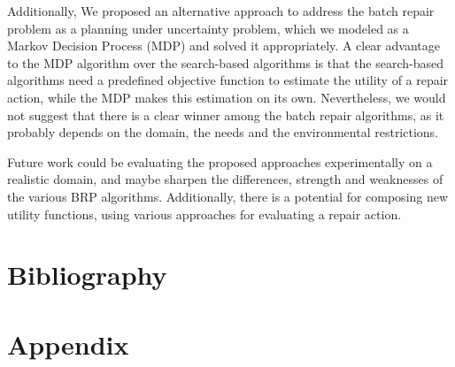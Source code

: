 \documentclass[review]{elsarticle}
\begin{document}
Additionally, We proposed an alternative approach to address the batch repair problem as a planning under uncertainty problem, which we modeled as a Markov Decision Process (MDP) and solved it appropriately. A clear advantage to the MDP algorithm over the search-based algorithms is that the search-based algorithms need a predefined objective function to estimate the utility of a repair action, while the MDP makes this estimation on its own.
Nevertheless, we would not suggest that there is a clear winner among the batch repair algorithms, as it probably depends on the domain, the needs and the environmental restrictions.

Future work could be evaluating the proposed approaches experimentally on a realistic domain, and maybe sharpen the differences, strength and weaknesses of the various BRP algorithms. Additionally, there is a potential for composing  new utility functions, using various approaches for evaluating a repair action. 




%
\section*{Bibliography}


\section*{Appendix}
\end{document}
